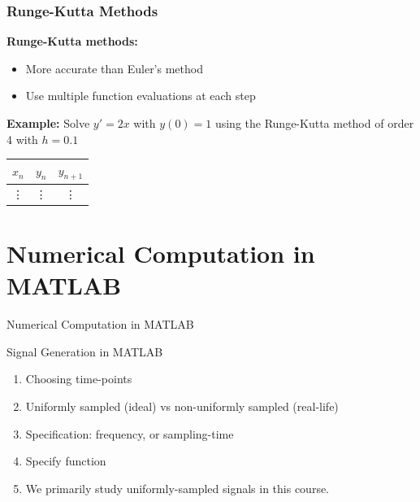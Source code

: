 \documentclass[aspectratio=169,xcolor=dvipsnames,svgnames,x11names,fleqn]{beamer}
\begin{document}
\begin{frame}
  \frametitle{Runge-Kutta Methods}
  \textbf{Runge-Kutta methods:}
  \begin{itemize}
    \item More accurate than Euler's method
    \item Use multiple function evaluations at each step
  \end{itemize}
  \textbf{Example:} Solve $y' = 2x$ with $y(0) = 1$ using the Runge-Kutta method of order 4 with $h = 0.1$
  \begin{table}
    \begin{tabular}{c|c|c}
      $x_n$ & $y_n$ & $y_{n+1}$ \\
      \hline
      \vdots & \vdots & \vdots
    \end{tabular}
  \end{table}
\end{frame}

\section{Numerical Computation in MATLAB}

\begin{frame}{}
    \begin{center}
    \Huge \bf \color{DarkBlue}
    \faFire
    
Numerical Computation in MATLAB

\end{center}
\end{frame}


\begin{frame}[containsverbatim]{Signal Generation in MATLAB}

\begin{enumerate}
\item Choosing time-points
\item Uniformly sampled (ideal) vs non-uniformly sampled (real-life)
\item Specification: frequency, or sampling-time
\item Specify function
\item We primarily study uniformly-sampled signals in this course.
\end{enumerate}

\end{frame}
\end{document}
